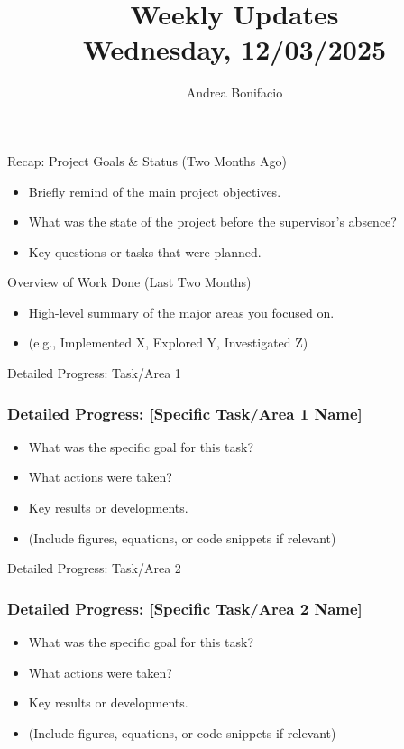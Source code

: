 \documentclass{beamer}
\title{Weekly Updates\\
\tiny{Wednesday, 12/03/2025}}
\author{Andrea Bonifacio}
\date{}
\begin{document}
\begin{frame}
\titlepage
\end{frame}

\begin{frame}{Recap: Project Goals \& Status (Two Months Ago)}
    \begin{itemize}
        \item Briefly remind of the main project objectives.
        \item What was the state of the project before the supervisor's absence?
        \item Key questions or tasks that were planned.
    \end{itemize}
\end{frame}

\begin{frame}{Overview of Work Done (Last Two Months)}
    \begin{itemize}
        \item High-level summary of the major areas you focused on.
        \item (e.g., Implemented X, Explored Y, Investigated Z)
    \end{itemize}
\end{frame}

\begin{frame}{Detailed Progress: Task/Area 1}
    \frametitle{Detailed Progress: [Specific Task/Area 1 Name]}
    \begin{itemize}
        \item What was the specific goal for this task?
        \item What actions were taken?
        \item Key results or developments.
        \item (Include figures, equations, or code snippets if relevant)
    \end{itemize}
\end{frame}

\begin{frame}{Detailed Progress: Task/Area 2}
    \frametitle{Detailed Progress: [Specific Task/Area 2 Name]}
    \begin{itemize}
        \item What was the specific goal for this task?
        \item What actions were taken?
        \item Key results or developments.
        \item (Include figures, equations, or code snippets if relevant)
    \end{itemize}
\end{frame}
\end{document}

